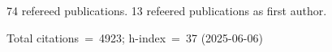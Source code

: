 74 refereed publications. 13 refeered publications as first author.

Total citations~=~4923; h-index~=~37 (2025-06-06)
